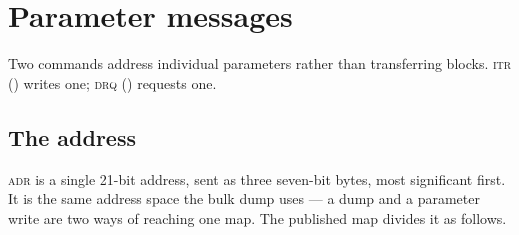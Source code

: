 \chapter{Parameter messages}\label{ch:params}

Two commands address individual parameters rather than transferring blocks.
\textsc{itr} () writes one; \textsc{drq} () requests one.

\begin{center}
\end{center}

\section{The address}
\textsc{adr} is a single 21-bit address, sent as three seven-bit bytes, most significant
first. It is the same address space the bulk dump uses --- a dump and a parameter write are
two ways of reaching one map. The published map divides it as follows.

